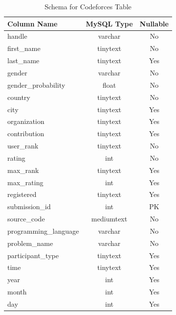 \documentclass[12pt]{article}
\begin{document}
\begin{table}[h!]
    \begin{center}
        \caption{Schema for Codeforces Table}
        \label{tab:cf_schema}
        \begin{tabular}{|l | c | c |}
            \hline
            \textbf{Column Name} & \textbf{MySQL Type} & \textbf{Nullable}\\
            \hline
            handle & varchar & No\\
            first{\_}name & tinytext & No\\
            last{\_}name & tinytext & Yes\\
            gender & varchar & No\\
            gender{\_}probability & float & No\\
            country & tinytext & No\\
            city & tinytext & Yes\\
            organization & tinytext & Yes\\
            contribution & tinytext & Yes\\
            user{\_}rank & tinytext & No\\
            rating & int & No\\
            max{\_}rank & tinytext & Yes\\
            max{\_}rating & int & Yes\\
            registered & tinytext & Yes\\
            \hline
            submission{\_}id & int & PK\\
            source{\_}code & mediumtext & No\\
            programming{\_}language & varchar & No\\
            problem{\_}name & varchar & No\\
            participant{\_}type & tinytext & Yes\\
            time & tinytext & Yes\\
            year & int & Yes\\
            month & int & Yes\\
            day & int & Yes\\
            \hline
        \end{tabular}
    \end{center}
\end{table}
\end{document}

